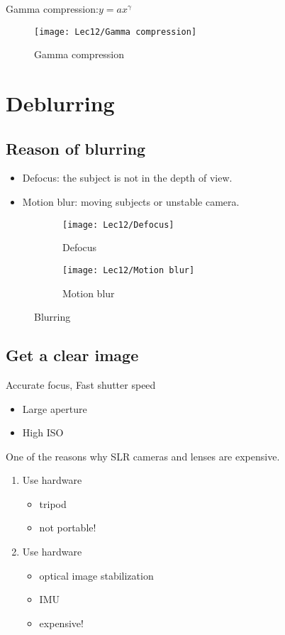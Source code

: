 Gamma compression:$y=ax^{\gamma}$

\begin{figure}[H]
    \centering
    \texttt{[image: Lec12/Gamma compression]}
    \caption{Gamma compression}
\end{figure}

\section{Deblurring}
\subsection{Reason of blurring}
\begin{itemize}
    \item Defocus: the subject is not in the depth of view. 
    \item Motion blur: moving subjects or unstable camera. 
\end{itemize}

\begin{figure}[H]
    \centering
    \begin{subfigure}{0.309\textwidth}
        \centering
        \texttt{[image: Lec12/Defocus]}
        \caption{Defocus}
    \end{subfigure}
    \begin{subfigure}{0.309\textwidth}
        \centering
        \texttt{[image: Lec12/Motion blur]}
        \caption{Motion blur}
    \end{subfigure}
    \caption{Blurring}
\end{figure}

\subsection{Get a clear image}
Accurate focus, Fast shutter speed
\begin{itemize}
    \item Large aperture
    \item High ISO
\end{itemize}
One of the reasons why SLR cameras and lenses are expensive. 
\begin{enumerate}
    \item Use hardware
    \begin{itemize}
        \item tripod
        \item not portable!
    \end{itemize}
    \item Use hardware
    \begin{itemize}
        \item optical image stabilization
        \item IMU
        \item expensive!
    \end{itemize}
\end{enumerate}

